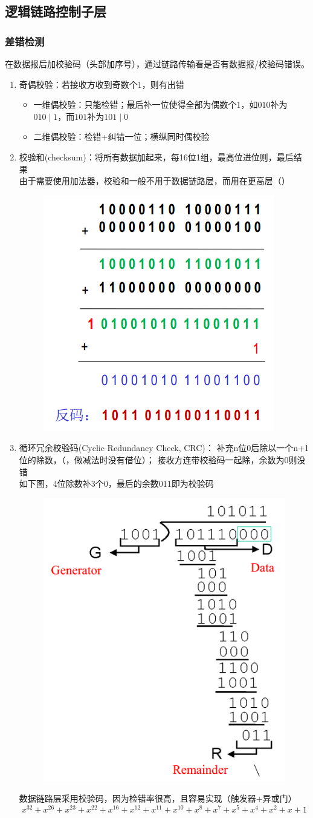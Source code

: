 \subsection{逻辑链路控制子层}
\subsubsection{差错检测}
在数据报后加校验码（头部加序号），通过链路传输看是否有数据报/校验码错误。
\begin{enumerate}
\item 奇偶校验：若接收方收到奇数个1，则有出错
\begin{itemize}
	\item 一维偶校验：只能检错；最后补一位使得全部为偶数个1，如$010$补为$010\mid 1$，而$101$补为$101\mid 0$
	\item 二维偶校验：检错+纠错一位；横纵同时偶校验
\end{itemize}
\item 校验和(checksum)：将所有数据加起来，每16位1组，最高位进位则，最后结果\\
由于需要使用加法器，校验和一般不用于数据链路层，而用在更高层（）
\begin{figure}[H]
	\centering
	\includegraphics[width=0.3\linewidth]{fig/checksum.PNG}
\end{figure}
\item 循环冗余校验码(Cyclic Redundancy Check, CRC)：
补充n位0后除以一个n+1位的除数，（，做减法时没有借位）；
接收方连带校验码一起除，余数为0则没错\\
如下图，4位除数补3个0，最后的余数011即为校验码
\begin{figure}[H]
	\centering
	\includegraphics[width=0.3\linewidth]{fig/CRC.PNG}
\end{figure}
数据链路层采用校验码，因为检错率很高，且容易实现（触发器+异或门）
\[x^{{32}}+x^{{26}}+x^{{23}}+x^{{22}}+x^{{16}}+x^{{12}}+x^{{11}}+x^{{10}}+x^{8}+x^{7}+x^{5}+x^{4}+x^{2}+x+1\]
\end{enumerate}

